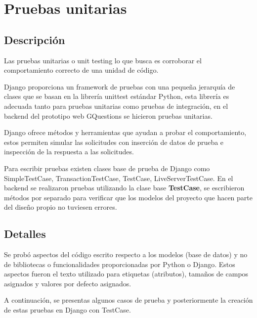 \documentclass[../Main.tex]{subfiles}
\begin{document}
    \section{Pruebas unitarias}
    \subsection{Descripción}
    \begin{justify}
    Las pruebas unitarias o unit testing lo que busca es corroborar el comportamiento correcto de una unidad de código.
    
    Django proporciona un framework de pruebas con una pequeña jerarquía de clases que se basan en la librería unittest estándar Python, esta librería es adecuada tanto para pruebas unitarias como pruebas de integración, en el backend del prototipo web GQuestions se hicieron pruebas unitarias.  
    
    Django ofrece métodos y herramientas que ayudan a probar el comportamiento, estos permiten simular las solicitudes con inserción de datos de prueba e inspección de la respuesta a las solicitudes.
    
    Para escribir pruebas existen clases base de prueba de Django como SimpleTestCase, TransactionTestCase, TestCase, LiveServerTestCase. En el backend se realizaron pruebas utilizando la clase base \textbf{TestCase}, se escribieron métodos por separado para verificar que los modelos del proyecto que hacen parte del diseño propio no tuviesen errores.
    
    \subsection{Detalles}
    Se probó aspectos del código escrito respecto a los modelos (base de datos) y no de bibliotecas o funcionalidades proporcionadas por Python o Django. Estos aspectos fueron el texto utilizado para etiquetas (atributos), tamaños de campos asignados y valores por defecto asignados.
    
    A continuación, se presentas algunos casos de prueba y posteriormente la creación de estas pruebas en Django con TestCase.
    \end{justify}
    
\end{document}
